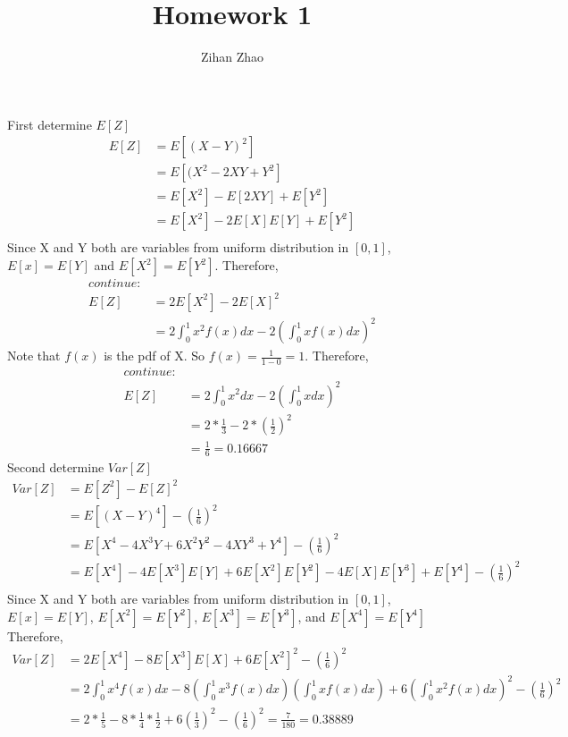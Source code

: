 \documentclass{article}
\author{Zihan Zhao}
\affil{1001103708}
\title{Homework 1}
\date{}
\begin{document}
\maketitle
\section{}
\renewcommand{\thesubsection}{(\alph{subsection})}
\subsection{}
First determine $E[Z]$
\begin{align*}
  E[Z] &= E[(X-Y)^2]\\
  &= E[(X^2 - 2XY + Y^2]\\
  &= E[X^2] - E[2XY] + E[Y^2]\\
  &= E[X^2] - 2E[X]E[Y] + E[Y^2]\\
\end{align*}
Since X and Y both are variables from uniform distribution in $[0,1]$, $E[x] = E[Y]$ and $E[X^2] = E[Y^2]$. Therefore,
\begin{align*}
    continue:\\
    E[Z] &= 2E[X^2] - 2E[X]^2\\
    &= 2\int^1_0 x^2f(x)dx - 2(\int^1_0 xf(x)dx)^2
\end{align*}
Note that $f(x)$ is the pdf of X. So $f(x) = \frac{1}{1-0} = 1$. Therefore,
\begin{align*}
    continue:\\
    E[Z] &= 2\int^1_0 x^2dx - 2(\int^1_0 xdx)^2\\
    &= 2*\frac{1}{3} - 2*(\frac{1}{2})^2\\
    &= \frac{1}{6} = 0.16667
\end{align*}
Second determine $Var[Z]$
\begin{align*}
    Var[Z] &= E[Z^2]-E[Z]^2\\
    &= E[(X-Y)^4]-(\frac{1}{6})^2\\
    &= E[X^4-4X^3Y+6X^2Y^2-4XY^3+Y^4]-(\frac{1}{6})^2\\
    &= E[X^4]-4E[X^3]E[Y]+6E[X^2]E[Y^2]-4E[X]E[Y^3]+E[Y^4]-(\frac{1}{6})^2\\
\end{align*}
Since X and Y both are variables from uniform distribution in $[0,1]$, $E[x] = E[Y]$, $E[X^2] = E[Y^2]$, $E[X^3] = E[Y^3]$, and $E[X^4] = E[Y^4]$ Therefore,
\begin{align*}
    Var[Z] &= 2E[X^4]-8E[X^3]E[X]+6E[X^2]^2-(\frac{1}{6})^2\\
    &= 2\int^1_0 x^4f(x)dx - 8(\int^1_0 x^3f(x)dx)(\int^1_0 xf(x)dx) + 6(\int^1_0 x^2f(x)dx)^2-(\frac{1}{6})^2\\
    &= 2*\frac{1}{5} - 8*\frac{1}{4}*\frac{1}{2} + 6(\frac{1}{3})^2-(\frac{1}{6})^2=\frac{7}{180}=0.38889
\end{align*}
\end{document}

